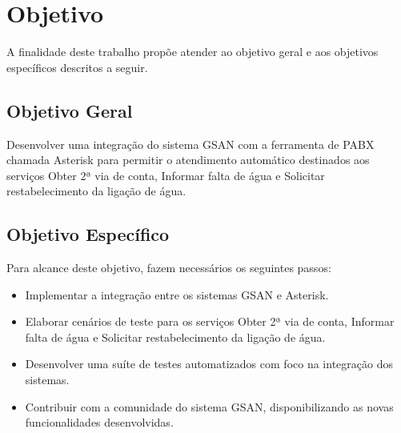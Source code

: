 \section*{Objetivo}

A finalidade deste trabalho propõe atender ao objetivo geral e aos objetivos específicos descritos a seguir.

\subsection*{Objetivo Geral}

Desenvolver uma integração do sistema GSAN com a ferramenta de PABX chamada Asterisk para permitir o atendimento automático destinados aos serviços Obter 2ª via de conta, Informar falta de água e Solicitar restabelecimento da ligação de água.

\subsection*{Objetivo Específico}
Para alcance deste objetivo, fazem necessários os seguintes passos:
\begin{itemize}
	\item Implementar a integração entre os sistemas GSAN e Asterisk.
	\item Elaborar cenários de teste para os serviços Obter 2ª via de conta, Informar falta de água e Solicitar restabelecimento da ligação de água.
	\item Desenvolver uma suíte de testes automatizados com foco na integração dos sistemas. 
	\item Contribuir com a comunidade do sistema GSAN, disponibilizando as novas funcionalidades desenvolvidas.
\end{itemize}